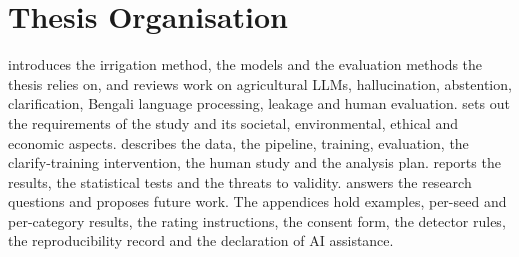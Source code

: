 \section{Thesis Organisation}
\label{sec:organisation}

 introduces the irrigation method, the models and the evaluation methods the thesis relies on, and reviews work on agricultural LLMs, hallucination, abstention, clarification, Bengali language processing, leakage and human evaluation.  sets out the requirements of the study and its societal, environmental, ethical and economic aspects.  describes the data, the pipeline, training, evaluation, the clarify-training intervention, the human study and the analysis plan.  reports the results, the statistical tests and the threats to validity.  answers the research questions and proposes future work. The appendices hold examples, per-seed and per-category results, the rating instructions, the consent form, the detector rules, the reproducibility record and the declaration of AI assistance.

